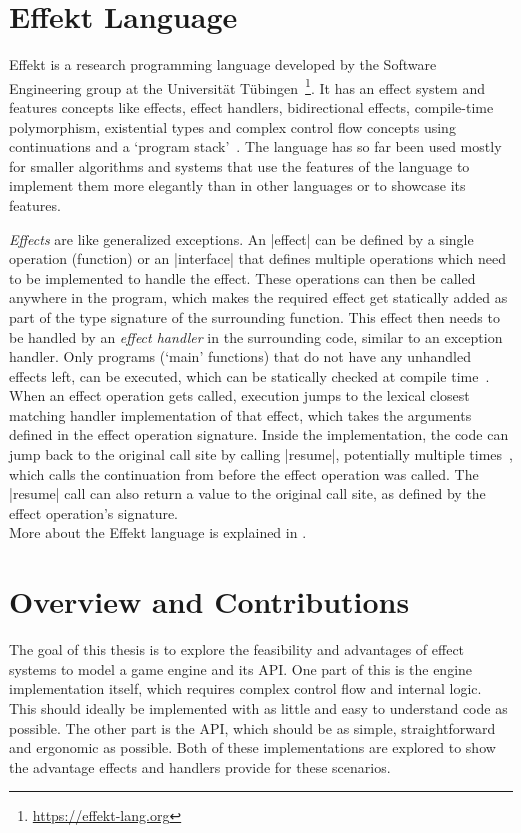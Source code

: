\section*{Effekt Language}

Effekt is a research programming language developed by the Software Engineering group at the Universität Tübingen~\footnote{\url{https://effekt-lang.org}}. It has an effect system and features concepts like effects, effect handlers, bidirectional effects, compile-time polymorphism, existential types and complex control flow concepts using continuations and a `program stack'~\cite{brachthauser2020effects}. The language has so far been used mostly for smaller algorithms and systems that use the features of the language to implement them more elegantly than in other languages or to showcase its features.

\textit{Effects} are like generalized exceptions. An |effect| can be defined by a single operation (function) or an |interface| that defines multiple operations which need to be implemented to handle the effect. These operations can then be called anywhere in the program, which makes the required effect get statically added as part of the type signature of the surrounding function. This effect then needs to be handled by an \textit{effect handler} in the surrounding code, similar to an exception handler. Only programs (`main' functions) that do not have any unhandled effects left, can be executed, which can be statically checked at compile time~\cite{brachthauser2022effects}. When an effect operation gets called, execution jumps to the lexical closest matching handler implementation of that effect, which takes the arguments defined in the effect operation signature. Inside the implementation, the code can jump back to the original call site by calling |resume|, potentially multiple times~\cite{muhcu2025multipleresumptions}, which calls the continuation from before the effect operation was called. The |resume| call can also return a value to the original call site, as defined by the effect operation's signature.\\
More about the Effekt language is explained in .

\section*{Overview and Contributions}

The goal of this thesis is to explore the feasibility and advantages of effect systems to model a game engine and its API. One part of this is the engine implementation itself, which requires complex control flow and internal logic. This should ideally be implemented with as little and easy to understand code as possible. The other part is the API, which should be as simple, straightforward and ergonomic as possible. Both of these implementations are explored to show the advantage effects and handlers provide for these scenarios.

